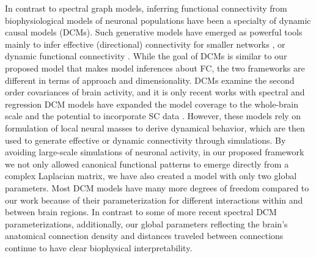 \documentclass{article}
\begin{document}
In contrast to spectral graph models, inferring functional connectivity from biophysiological models of neuronal populations have been a specialty of dynamic causal models (DCMs). Such generative models have emerged as powerful tools mainly to infer effective (directional) connectivity for smaller networks \cite{daunizeau_dynamic_2009, stephan_nonlinear_2008, pinotsis_linking_2017, razi_construct_2015, park_dynamic_2018}, or dynamic functional connectivity \cite{preti_dynamic_2017, van_de_steen_dynamic_2019}. While the goal of DCMs is similar to our proposed model that makes model inferences about FC, the two frameworks are different in terms of approach and dimensionality. DCMs examine the second order covariances of brain activity, and it is only recent works with spectral and regression DCM models have expanded the model coverage to the whole-brain scale and the potential to incorporate SC data \cite{frassle_generative_2018, frassle_regression_2017, razi_large-scale_2017}. However, these models rely on formulation of local neural masses to derive dynamical behavior, which are then used to generate effective or dynamic connectivity through simulations. By avoiding large-scale simulations of neuronal activity, in our proposed framework we not only allowed canonical functional patterns to emerge directly from a complex Laplacian matrix, we have also created a model with only two global parameters. Most DCM models have many more degrees of freedom compared to our work because of their parameterization for different interactions within and between brain regions. In contrast to some of more recent spectral DCM parameterizations, additionally, our global parameters reflecting the brain's anatomical connection density and distances traveled between connections continue to have clear biophysical interpretability.
\end{document}
